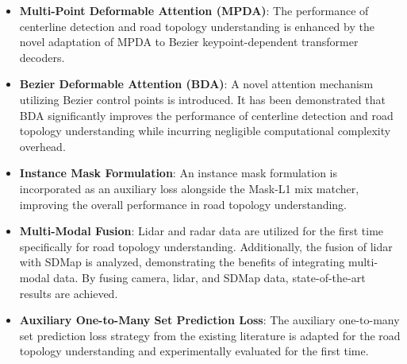 \begin{itemize}
    \item \textbf{Multi-Point Deformable Attention (MPDA)}: The performance of centerline detection and road topology understanding is enhanced by the novel adaptation of MPDA to Bezier keypoint-dependent transformer decoders.
    \item \textbf{Bezier Deformable Attention (BDA)}: A novel attention mechanism utilizing Bezier control points is introduced. It has been demonstrated that BDA significantly improves the performance of centerline detection and road topology understanding while incurring negligible computational complexity overhead.
    \item \textbf{Instance Mask Formulation}: An instance mask formulation is incorporated as an auxiliary loss alongside the Mask-L1 mix matcher, improving the overall performance in road topology understanding.
    \item \textbf{Multi-Modal Fusion}: Lidar and radar data are utilized for the first time specifically for road topology understanding. Additionally, the fusion of lidar with SDMap is analyzed, demonstrating the benefits of integrating multi-modal data. By fusing camera, lidar, and SDMap data, state-of-the-art results are achieved.
    \item \textbf{Auxiliary One-to-Many Set Prediction Loss}: The auxiliary one-to-many set prediction loss strategy from the existing literature is adapted for the road topology understanding and experimentally evaluated for the first time. 
\end{itemize}